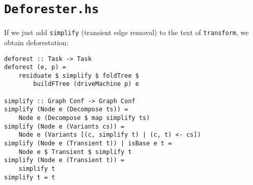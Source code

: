 \section{\texttt{Deforester.hs}}
If we just add \texttt{simplify} (transient edge removal) to the text of \texttt{transform},
we obtain deforestation:
\begin{lstlisting}[name=deforester]
deforest :: Task -> Task
deforest (e, p) =
	residuate $ simplify $ foldTree $ 
		buildFTree (driveMachine p) e

simplify :: Graph Conf -> Graph Conf
simplify (Node e (Decompose ts)) =
	Node e (Decompose $ map simplify ts)
simplify (Node e (Variants cs)) =
	Node e (Variants [(c, simplify t) | (c, t) <- cs])
simplify (Node e (Transient t)) | isBase e t =
	Node e $ Transient $ simplify t
simplify (Node e (Transient t)) =
	simplify t
simplify t = t
\end{lstlisting}